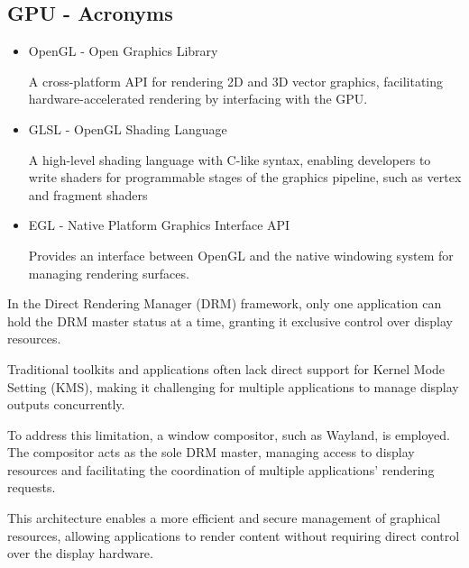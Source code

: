 \documentclass[11pt]{article}
\begin{document}
\subsection{GPU - Acronyms}

\begin{itemize}
    \item OpenGL - Open Graphics Library

        A cross-platform API for rendering 2D and 3D vector graphics,
        facilitating hardware-accelerated rendering by interfacing with the GPU.

    \item GLSL - OpenGL Shading Language

        A high-level shading language with C-like syntax, enabling developers to
        write shaders for programmable stages of the graphics pipeline, such as
        vertex and fragment shaders

    \item EGL - Native Platform Graphics Interface API

        Provides an interface between OpenGL and the native windowing system
        for managing rendering surfaces.
\end{itemize}

In the Direct Rendering Manager (DRM) framework, only one application can hold
the DRM master status at a time, granting it exclusive control over display
resources.

Traditional toolkits and applications often lack direct support for Kernel Mode
Setting (KMS), making it challenging for multiple applications to manage display
outputs concurrently.

To address this limitation, a window compositor, such as Wayland, is employed.
The compositor acts as the sole DRM master, managing access to display resources
and facilitating the coordination of multiple applications' rendering requests.

This architecture enables a more efficient and secure management of graphical
resources, allowing applications to render content without requiring direct
control over the display hardware.

\newpage
\printbibliography
\end{document}
